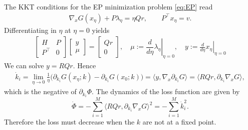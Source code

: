 \documentclass[final, 11pt, nonatbib]{elsarticle}
\theoremstyle{definition}
\theoremstyle{plain}
\numberwithin{equation}{section}
\begin{document}
The KKT conditions for the EP minimization problem \eqref{eq:EP} read
\begin{align}
\nabla_x G(x_\eta) + P\lambda_\eta = \eta Qr,\qquad P^\top x_\eta = v.\label{eq:kkt-eta-EP}
\end{align}
Differentiating in $\eta$ at $\eta=0$ yields
\begin{align}
\begin{bmatrix}
H & P\\
P^\top & 0
\end{bmatrix}
\begin{bmatrix}
y\\
\mu
\end{bmatrix}
=
\begin{bmatrix}
Qr\\
0
\end{bmatrix}, \quad \mu :=\left.\dfrac{d}{d\eta}\lambda_\eta\right|_{\eta=0} ,\quad
y := \left. \frac{d}{d\eta}x_\eta\right  |_{\eta=0}\label{eq:psi}
\end{align}
We can solve $y = RQr.$ Hence
\begin{align}
\dot{k}_i=\lim_{\eta\to 0}\frac{1}{\eta}\Big(\partial_{k_i}G(x_\eta;k)-\partial_{k_i}G(x_0;k)\Big)
= \big\langle y, \nabla_x \partial_{k_i}G\big\rangle
= \big\langle R Qr,\partial_{k_i}\nabla_x G\big\rangle\label{eq:dynamics-EP},
\end{align}
which is the negative of $\partial_{k_i}\Phi$.
The dynamics of the loss function are given by
\begin{equation}
    \dot{\Phi} = - \sum_{i=1}^M\big\langle R Q r,\partial_{k_i}\nabla_x G\big\rangle^2=- \sum_{i=1}^M\dot{k}_i^2.
\end{equation}
Therefore the loss must decrease when the $k$ are not at a fixed point.
\end{document}
